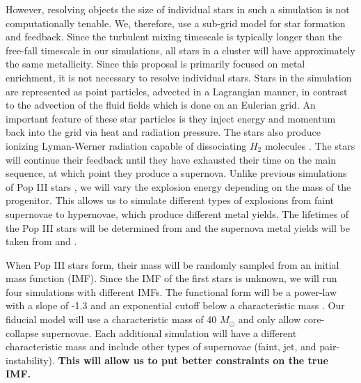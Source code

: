 \documentclass[letterpaper, 12pt]{article}
\begin{document}
However, resolving objects the size of individual stars in such a simulation is not computationally tenable. We, therefore, use a sub-grid model for star formation and feedback. Since the turbulent mixing timescale is typically longer than the free-fall timescale in our simulations, all stars in a cluster will have approximately the same metallicity. Since this proposal is primarily focused on metal enrichment, it is not necessary to resolve individual stars. Stars in the simulation are represented as point particles, advected in a Lagrangian manner, in contrast to the advection of the fluid fields which is done on an Eulerian grid. An important feature of these star particles is they inject energy and momentum back into the grid via heat and radiation pressure. The stars also produce ionizing Lyman-Werner radiation capable of dissociating $H_2$ molecules \citep{Safranek-Shrader2012}. The stars will continue their feedback until they have exhausted their time on the main sequence, at which point they produce a supernova. Unlike previous simulations of Pop III stars \citep[e.g.][]{Smith2015, Chiaki2019}, we will vary the explosion energy depending on the mass of the progenitor. This allows us to simulate different types of explosions from faint supernovae to hypernovae, which produce different metal yields. The lifetimes of the Pop III stars will be determined from \cite{Schaerer2002} and the supernova metal yields will be taken from \cite{Nomoto2006} and \cite{Heger2010}.

When Pop III stars form, their mass will be randomly sampled from an initial mass function (IMF). Since the IMF of the first stars is unknown, we will run four simulations with different IMFs. The functional form will be a power-law with a slope of -1.3 and an exponential cutoff below a characteristic mass \citep{Wise2012}. Our fiducial model will use a characteristic mass of 40 $M_{\odot}$ and only allow core-collapse supernovae. Each additional simulation will have a different characteristic mass and include other types of supernovae (faint, jet, and pair-instability). \textbf{This will allow us to put better constraints on the true IMF.}
 
\end{document}
